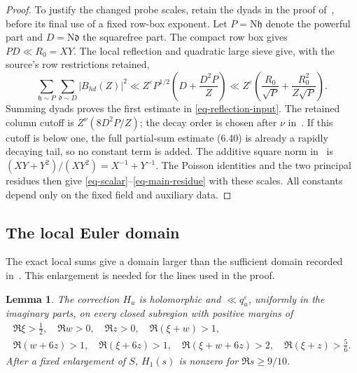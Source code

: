 \documentclass[11pt,a4paper]{article}
\numberwithin{equation}{section}
\newtheorem{lemma}[theorem]{Lemma}
\theoremstyle{remark}
\newcommand{\eps}{\varepsilon}
\newcommand{\N}{\mathrm N}
\begin{document}
\begin{proof}
To justify the changed probe scales, retain the dyads in the
proof of~\cite[Section~6.4]{OAI}, before its final use of a fixed
row-box exponent.  Let $P=\N\mathfrak h$ denote the powerful
part and $D=\N\mathfrak d$ the squarefree part.  The compact
row box gives $PD\ll R_0=XY$.  The local reflection and quadratic
large sieve give, with the source's row restrictions retained,
\[
 \sum_{\mathfrak h\sim P}\sum_{\mathfrak d\sim D}|B_{hd}(Z)|^2
 \ll Z^\eps P^{1/2}\left(D+\frac{D^2P}{Z}\right)
 \ll Z^\eps\left(\frac{R_0}{\sqrt P}
                    +\frac{R_0^2}{Z\sqrt P}\right).
\]
Summing dyads proves the first estimate in \eqref{eq-reflection-input}.
The retained column cutoff is $Z^\nu(8D^2P/Z)$; the decay order
is chosen after $\nu$ in~\cite[(6.40)--(6.45)]{OAI}.
If this cutoff is below one, the full partial-sum estimate (6.40)
is already a rapidly decaying tail, so no constant term is added.
The additive square norm in~\cite[Section~7.1]{OAI} is
$(XY+Y^2)/(XY^2)=X^{-1}+Y^{-1}$.
The Poisson identities and the two principal residues then give
\eqref{eq-scalar}--\eqref{eq-main-residue} with these scales.
All constants depend only on the fixed field and auxiliary data.
\end{proof}

\subsection{The local Euler domain}

The exact local sums give a domain larger than the sufficient
domain recorded in~\cite[(7.21)]{OAI}.  This enlargement is needed
for the lines used in the proof.

\begin{lemma}\label{lem-euler}
The correction $H_u$ is holomorphic and $\ll q_u^\eps$, uniformly
in the imaginary parts, on every closed subregion with positive
margins of
\begin{equation}\label{eq-domain}
\begin{gathered}
 \Re\xi>\tfrac12,\quad \Re w>0,\quad \Re z>0,\quad
 \Re(\xi+w)>1,\\
 \Re(w+6z)>1,\quad\Re(\xi+6z)>1,\quad
 \Re(\xi+w+6z)>2,\quad\Re(\xi+z)>\tfrac56.
\end{gathered}
\end{equation}
After a fixed enlargement of $S$, $H_1(s)$ is nonzero for
$\Re s\ge9/10$.
\end{lemma}
\end{document}
